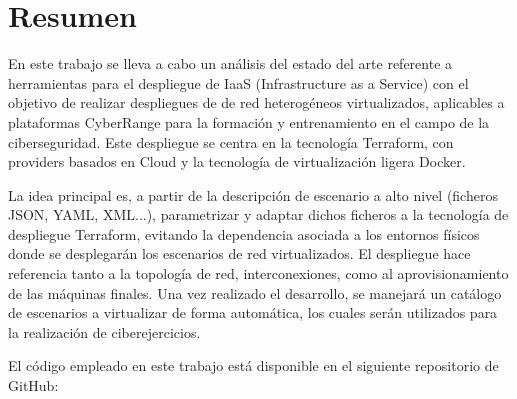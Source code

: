 \newpage
\thispagestyle{plain}
\section*{Resumen}

En este trabajo se lleva a cabo un análisis del estado del arte referente a herramientas para el despliegue de IaaS (Infrastructure as a Service) con el objetivo de realizar despliegues de de red heterogéneos virtualizados, aplicables a plataformas CyberRange para la formación y entrenamiento en el campo de la ciberseguridad. Este despliegue se centra en la tecnología Terraform, con providers basados en Cloud y la tecnología de virtualización ligera Docker.

La idea principal es, a partir de la descripción de escenario a alto nivel (ficheros JSON, YAML, XML...), parametrizar y adaptar dichos ficheros a la tecnología de despliegue Terraform, evitando la dependencia asociada a los entornos físicos donde se desplegarán los escenarios de red virtualizados. El despliegue hace referencia tanto a la topología de red, interconexiones, como al aprovisionamiento de las máquinas finales. Una vez realizado el desarrollo, se manejará un catálogo de escenarios a virtualizar de forma automática, los cuales serán utilizados para la realización de ciberejercicios.

El código empleado en este trabajo está disponible en el siguiente repositorio de GitHub:

\vspace{0.2cm}

\begin{tcolorbox}[colback=orange!5!white,colframe=orange!75!black]
  \centering\href{https://github.com/samugs13/DAERV}{\textbf{\color{blue}{https://github.com/samugs13/DAERV}}}
\end{tcolorbox}

\afterpage{\blankpage}

